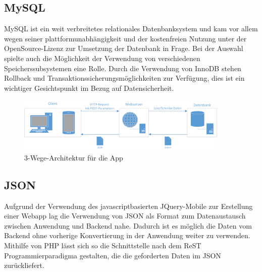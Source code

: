 \documentclass[10pt, conference, compsocconf]{IEEEtran}
\begin{document}
\subsection{MySQL}
MySQL ist ein weit verbreitetes relationales Datenbanksystem und kam vor allem wegen seiner plattformunabh\"angigkeit und der kostenfreien Nutzung unter der OpenSource-Lizenz zur Umsetzung der Datenbank in Frage. 
Bei der Auswahl spielte auch die M\"oglichkeit der Verwendung von verschiedenen Speicherssubsystemen eine Rolle. 
Durch die Verwendung von InnoDB stehen Rollback und Transaktionssicherungsm\"oglichkeiten zur Verf\"ugung, dies ist ein wichtiger Gesichtspunkt im Bezug auf Datensicherheit.

\begin{figure}[t]
	\centering
	\includegraphics[width=0.9\textwidth]{./Bilder_Zeichnungen/Architektur.png}
	\caption{3-Wege-Architektur f\"ur die App}
	\label{fig:Architektur}
\end{figure}

\subsection{JSON}
Aufgrund der Verwendung des javascriptbasierten JQuery-Mobile zur Erstellung einer Webapp lag die Verwendung von JSON als Format zum Datenaustausch zwischen Anwendung und Backend nahe. 
Dadurch ist es m\"oglich die Daten vom Backend ohne vorherige Konvertierung in der Anwendung weiter zu verwenden. 
Mithilfe von PHP l\"asst sich so die Schnittstelle nach dem ReST Programmierparadigma gestalten, die die geforderten Daten im JSON zur\"uckliefert. 
\end{document}
